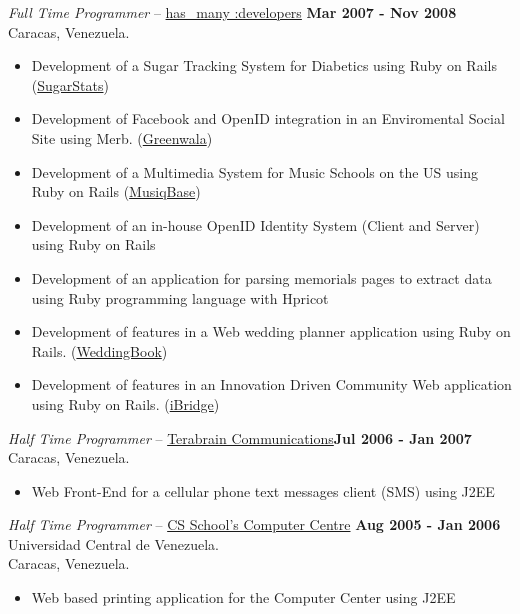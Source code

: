 \documentclass[line,margin]{res}
\begin{document}
\begin{resume}
  {\sl Full Time Programmer} -- \href{http://www.hasmanydevelopers.com}{has\_many :developers} \hfill \textbf{Mar 2007 - Nov 2008} \\
  \hspace*{110pt} Caracas, Venezuela. \\
  \begin{itemize}
    \item Development of a Sugar Tracking System for Diabetics using Ruby on Rails (\href{http://www.sugarstats.com}{SugarStats})
    \item Development of Facebook and OpenID integration in an Enviromental Social Site using Merb. (\href{http://www.greenwala.com}{Greenwala})
    \item Development of a Multimedia System for Music Schools on the US using Ruby on Rails (\href{http://www.musiqbase.com}{MusiqBase})
    \item Development of an in-house OpenID Identity System (Client and Server) using Ruby on Rails
    \item Development of an application for parsing memorials pages to extract data using Ruby programming language with Hpricot 
    \item Development of features in a Web wedding planner application using Ruby on Rails. (\href{http://weddingbook.com/}{WeddingBook})
    \item Development of features in an Innovation Driven Community Web application using Ruby on Rails. (\href{http://www.ibridge.com}{iBridge})
  \end{itemize}

  {\sl Half Time Programmer} -- \href{www.terabrain.com}{Terabrain Communications}\hfill \textbf{Jul 2006 - Jan 2007}
  \hspace*{110pt} Caracas, Venezuela. \\
  \begin{itemize}
    \item Web Front-End for a cellular phone text messages client (SMS) using J2EE
  \end{itemize}

  {\sl Half Time Programmer} -- \href{www.ciens.ucv.ve/ccc}{CS School’s Computer Centre}\hspace{20pt} \textbf{Aug 2005 - Jan 2006}
  \hspace*{115pt} Universidad Central de Venezuela. \\
  \hspace*{115pt} Caracas, Venezuela. \\
  \begin{itemize}
    \item Web based printing application for the Computer Center using J2EE
  \end{itemize}
 

\end{resume}
\end{document}
